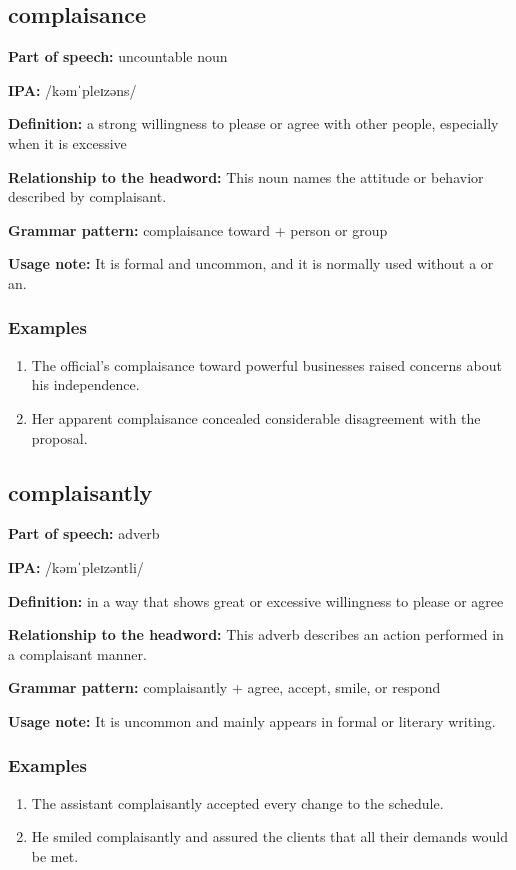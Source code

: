 \documentclass[11pt]{article}
\begin{document}
\subsection{complaisance}
\textbf{Part of speech:} uncountable noun

\textbf{IPA:} /kəmˈpleɪzəns/

\textbf{Definition:} a strong willingness to please or agree with other people, especially when it is excessive

\textbf{Relationship to the headword:} This noun names the attitude or behavior described by complaisant.

\textbf{Grammar pattern:} complaisance toward + person or group

\textbf{Usage note:} It is formal and uncommon, and it is normally used without a or an.

\subsubsection{Examples}
\begin{enumerate}
  \item The official's complaisance toward powerful businesses raised concerns about his independence.
  \item Her apparent complaisance concealed considerable disagreement with the proposal.
\end{enumerate}

\subsection{complaisantly}
\textbf{Part of speech:} adverb

\textbf{IPA:} /kəmˈpleɪzəntli/

\textbf{Definition:} in a way that shows great or excessive willingness to please or agree

\textbf{Relationship to the headword:} This adverb describes an action performed in a complaisant manner.

\textbf{Grammar pattern:} complaisantly + agree, accept, smile, or respond

\textbf{Usage note:} It is uncommon and mainly appears in formal or literary writing.

\subsubsection{Examples}
\begin{enumerate}
  \item The assistant complaisantly accepted every change to the schedule.
  \item He smiled complaisantly and assured the clients that all their demands would be met.
\end{enumerate}
\end{document}

